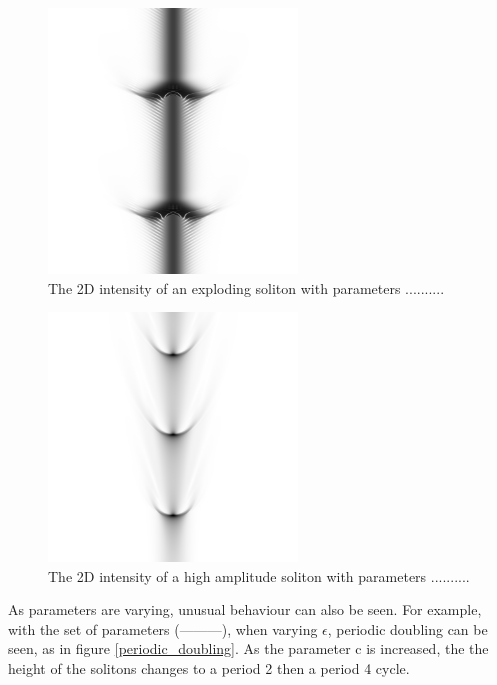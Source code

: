 \documentclass[a4paper,12pt]{report}
\begin{document}
\begin{figure}[h]
\centering
\includegraphics[width=2.6in]{expl}
\caption{The 2D intensity of an exploding soliton with parameters ..........}
\label{expl} 
\end{figure}
\begin{figure}[h]
\centering
\includegraphics[width=2.6in]{highamp}
\caption{The 2D intensity of a high amplitude soliton with parameters ..........}
\label{highamp} 
\end{figure}
As parameters are varying, unusual behaviour can also be seen. 
For example, with the set of parameters (---------), when varying $\epsilon$, periodic doubling can be seen, as in figure \ref{periodic_doubling}. As the parameter c is increased, the the height of the solitons changes to a period 2 then a period 4 cycle. 
\end{document}
